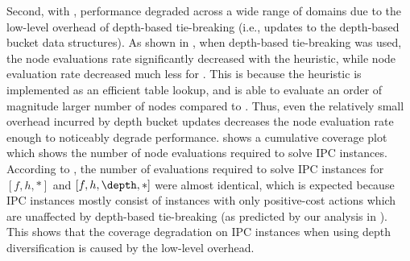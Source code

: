 Second, with \mands, performance degraded across a wide range of domains due to the low-level overhead of depth-based tie-breaking (i.e., updates to the depth-based bucket data structures).
As shown in , when depth-based tie-breaking was used, the node evaluations rate significantly decreased with the \mands heuristic, 
while node evaluation rate decreased much less for \lmcut.
This is because  the \mands heuristic is implemented
as an efficient table lookup, and \mands is able to evaluate an order of magnitude larger number of nodes compared to \lmcut.
Thus, even the relatively small overhead incurred by depth bucket updates decreases the node evaluation rate enough to noticeably degrade \mands performance.
 shows a cumulative coverage plot which shows the number of node evaluations
required to solve IPC instances.
% 
According to , the number of evaluations required to solve IPC instances
for  $[f,h,*]$ and $[f,h,\depth,*]$ were almost identical, which is expected because
IPC instances mostly consist of instances with only positive-cost actions which are unaffected by depth-based tie-breaking (as predicted by our analysis in ).
This shows that the coverage degradation on IPC instances when using depth diversification is caused by the low-level overhead. %
% 

